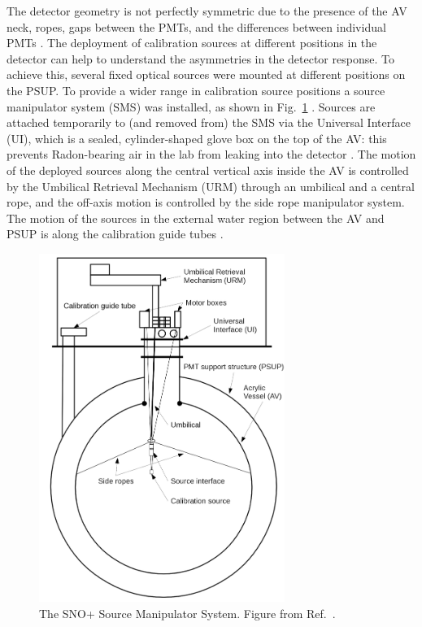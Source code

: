 The detector geometry is not perfectly symmetric due to the presence of the AV neck, ropes, gaps between the PMTs, and the differences between individual PMTs \cite{snop_jinst}. The deployment of calibration sources at different positions in the detector can help to understand the asymmetries in the detector response. To achieve this, several fixed optical sources were mounted at different positions on the PSUP. To provide a wider range in calibration source positions a source manipulator system (SMS) was installed, as shown in Fig.~\ref{fig:sms} \cite{snop_jinst}. Sources are attached temporarily to (and removed from) the SMS via the Universal Interface (UI), which is a sealed, cylinder-shaped glove box on the top of the AV: this prevents Radon-bearing air in the lab from leaking into the detector \cite{snop_jinst}. The motion of the deployed sources along the central vertical axis inside the AV is controlled by the Umbilical Retrieval Mechanism (URM) through an umbilical and a central rope, and the off-axis motion is controlled by the side rope manipulator system. The motion of the sources in the external water region between the AV and PSUP is along the calibration guide tubes \cite{snop_jinst}.

\begin{figure}[!htb]
	\centering
	\includegraphics[width=8cm]{SMS.png}
	\caption[The SNO+ Source Manipulator System.]{The SNO+ Source Manipulator System. Figure from Ref.~\cite{snop_jinst}.}
	\label{fig:sms}
\end{figure}


